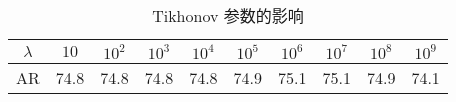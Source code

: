 \begin{table}[ht]
  \centering
  \caption{Tikhonov 参数的影响}
  \begin{tabular}{c|c|c|c|c|c|c|c|c|c}
    \toprule
    $\lambda$ & $10$ & $10^2$ & $10^3$ & $10^4$ & $10^5$ & $10^6$ & $10^7$ & $10^8$ & $10^9$ \\
    \midrule
    AR & 74.8 & 74.8 & 74.8 & 74.8 & 74.9 & 75.1 & 75.1 & 74.9 & 74.1 \\
    \bottomrule
  \end{tabular}
  \label{tab:ca_Tikhonov_Parameter}
\end{table}

